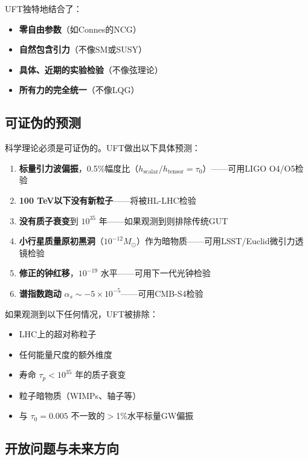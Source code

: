 UFT独特地结合了：
\begin{itemize}
    \item \textbf{零自由参数}（如Connes的NCG）
    \item \textbf{自然包含引力}（不像SM或SUSY）
    \item \textbf{具体、近期的实验检验}（不像弦理论）
    \item \textbf{所有力的完全统一}（不像LQG）
\end{itemize}

\subsection{可证伪的预测}

科学理论必须是可证伪的。UFT做出以下具体预测：

\begin{enumerate}
    \item \textbf{标量引力波偏振}，0.5\%幅度比（$h_{\text{scalar}}/h_{\text{tensor}} = \tau_0$）——可用LIGO O4/O5检验
    
    \item \textbf{100 TeV以下没有新粒子}——将被HL-LHC检验
    
    \item \textbf{没有质子衰变}到 $10^{35}$ 年——如果观测到则排除传统GUT
    
    \item \textbf{小行星质量原初黑洞}（$10^{-12} M_\odot$）作为暗物质——可用LSST/Euclid微引力透镜检验
    
    \item \textbf{修正的钟红移}，$10^{-19}$ 水平——可用下一代光钟检验
    
    \item \textbf{谱指数跑动} $\alpha_s \sim -5\times 10^{-5}$——可用CMB-S4检验
\end{enumerate}

如果观测到以下任何情况，UFT被排除：
\begin{itemize}
    \item LHC上的超对称粒子
    \item 任何能量尺度的额外维度
    \item 寿命 $\tau_p < 10^{35}$ 年的质子衰变
    \item 粒子暗物质（WIMPs、轴子等）
    \item 与 $\tau_0 = 0.005$ 不一致的$>$1\%水平标量GW偏振
\end{itemize}

\subsection{开放问题与未来方向}

